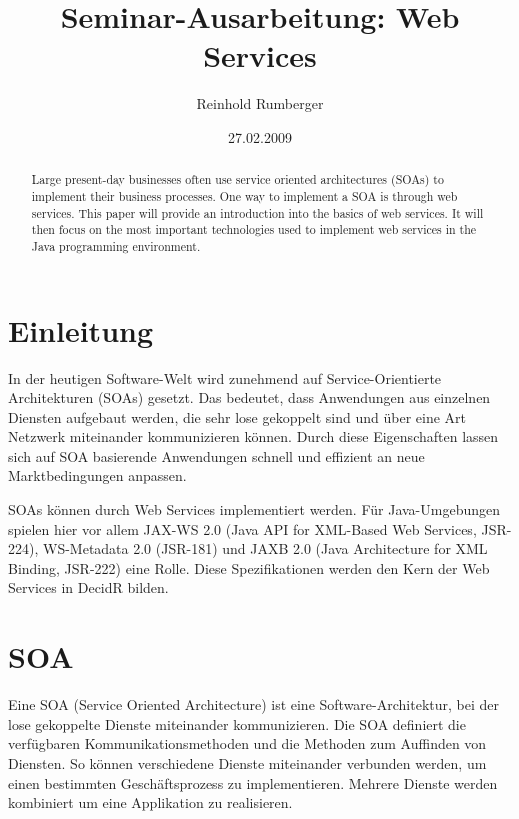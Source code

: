 \documentclass[runningheads]{llncs}
\author{Reinhold Rumberger}
\institute{Institute of Architecture of Application Systems (IAAS),\\
  University of Stuttgart\\
  \email{rumberrd@studi.informatik.uni-stuttgart.de}}
\title{Seminar-Ausarbeitung: Web Services}
\date{27.02.2009}
\newcommand{\germanquote}[1]{\glqq{}#1\grqq{}}
\newcommand{\decidr}{DecidR}
\begin{document}
  \frontmatter
  \pagestyle{headings}

  \maketitle
  \tableofcontents
  \mainmatter

  \nocite{bk_ralph}

  \label{abstract}
  \begin{otherlanguage}{english}
    \begin{abstract}
      Large present-day businesses often use service oriented architectures (SOAs) to implement
      their business processes. One way to implement a SOA is through web services. This paper will
      provide an introduction into the basics of web services. It will then focus on the most
      important technologies used to implement web services in the Java programming environment.
    \end{abstract}
  \end{otherlanguage}


  \label{intro}
  \section{Einleitung}
    In der heutigen Software-Welt wird zunehmend auf Service-Orientierte Architekturen (SOAs)
    gesetzt. Das bedeutet, dass Anwendungen aus einzelnen Diensten aufgebaut werden, die sehr lose
    gekoppelt sind und über eine Art Netzwerk miteinander kommunizieren können. Durch diese
    Eigenschaften lassen sich auf SOA basierende Anwendungen schnell und effizient an neue
    Marktbedingungen anpassen.

    SOAs können durch Web Services implementiert werden. Für Java-Um\-ge\-bung\-en spielen hier vor
    allem JAX-WS 2.0 (Java API for XML-Based Web Services, JSR-224), WS-Metadata 2.0 (JSR-181) und
    JAXB 2.0 (Java Architecture for XML Binding, JSR-222) eine Rolle. Diese Spezifikationen werden
    den Kern der Web Services in \decidr{} bilden.


  \label{soa}
  \section{SOA}
  \nocite{wk_soa}
    Eine \germanquote{SOA} (Service Oriented Architecture) ist eine Software-Architektur, bei der
    lose gekoppelte Dienste miteinander kommunizieren. Die SOA definiert die verfügbaren
    Kommunikationsmethoden und die Methoden zum Auffinden von Diensten. So können verschiedene
    Dienste miteinander verbunden werden, um einen bestimmten Geschäftsprozess zu implementieren.
    Mehrere Dienste werden kombiniert um eine Applikation zu realisieren.
\end{document}
